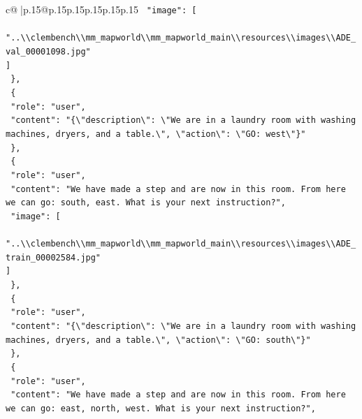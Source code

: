 \documentclass{article}
\begin{document}
{\begin{supertabular}{c@{$\;$}|p{.15\linewidth}@{}p{.15\linewidth}p{.15\linewidth}p{.15\linewidth}p{.15\linewidth}p{.15\linewidth}}
{{{\texttt{    "image": {[}} \\
\texttt{      "..\textbackslash{}\textbackslash{}clembench\textbackslash{}\textbackslash{}mm\_mapworld\textbackslash{}\textbackslash{}mm\_mapworld\_main\textbackslash{}\textbackslash{}resources\textbackslash{}\textbackslash{}images\textbackslash{}\textbackslash{}ADE\_val\_00001098.jpg"} \\
\texttt{    {]}} \\
\texttt{  \},} \\
\texttt{  \{} \\
\texttt{    "role": "user",} \\
\texttt{    "content": "\{\textbackslash{}"description\textbackslash{}": \textbackslash{}"We are in a laundry room with washing machines, dryers, and a table.\textbackslash{}", \textbackslash{}"action\textbackslash{}": \textbackslash{}"GO: west\textbackslash{}"\}"} \\
\texttt{  \},} \\
\texttt{  \{} \\
\texttt{    "role": "user",} \\
\texttt{    "content": "We have made a step and are now in this room. From here we can go: south, east. What is your next instruction?",} \\
\texttt{    "image": {[}} \\
\texttt{      "..\textbackslash{}\textbackslash{}clembench\textbackslash{}\textbackslash{}mm\_mapworld\textbackslash{}\textbackslash{}mm\_mapworld\_main\textbackslash{}\textbackslash{}resources\textbackslash{}\textbackslash{}images\textbackslash{}\textbackslash{}ADE\_train\_00002584.jpg"} \\
\texttt{    {]}} \\
\texttt{  \},} \\
\texttt{  \{} \\
\texttt{    "role": "user",} \\
\texttt{    "content": "\{\textbackslash{}"description\textbackslash{}": \textbackslash{}"We are in a laundry room with washing machines, dryers, and a table.\textbackslash{}", \textbackslash{}"action\textbackslash{}": \textbackslash{}"GO: south\textbackslash{}"\}"} \\
\texttt{  \},} \\
\texttt{  \{} \\
\texttt{    "role": "user",} \\
\texttt{    "content": "We have made a step and are now in this room. From here we can go: east, north, west. What is your next instruction?",} \\
}}}
\end{supertabular}}
\end{document}
